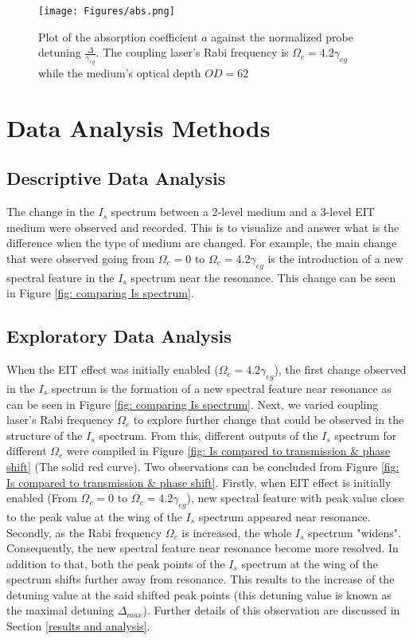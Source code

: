 \begin{figure}
    \centering
    \texttt{[image: Figures/abs.png]}
    \caption[Plot of Absorption Coefficient As A Function of Incident Probe Laser Detuning]{Plot of the absorption coefficient $a$ against the normalized probe detuning $\frac{\Delta}{\gamma_{eg}}$. The coupling laser's Rabi frequency is $\Omega_{c} = 4.2\gamma_{eg}$ while the medium's optical depth $OD = 62$}
    \label{fig: abs}
\end{figure}


\section{Data Analysis Methods}
\subsection{Descriptive Data Analysis}
The change in the $I_{s}$ spectrum between a 2-level medium and a 3-level EIT medium were observed and recorded. This is to visualize and answer what is the difference when the type of medium are changed. For example, the main change that were observed going from $\Omega_{c} = 0$ to $\Omega_{c} = 4.2\gamma_{eg}$ is the introduction of a new spectral feature in the $I_{s}$ spectrum near the resonance. This change can be seen in Figure \ref{fig: comparing Is spectrum}. 

\subsection{Exploratory Data Analysis}
When the EIT effect was initially enabled ($\Omega_{c} = 4.2\gamma_{eg}$), the first change observed in the $I_{s}$ spectrum is the formation of a new spectral feature near resonance as can be seen in Figure \ref{fig: comparing Is spectrum}. Next, we varied coupling laser's Rabi frequency $\Omega_{c}$ to explore further change that could be observed in the structure of the $I_{s}$ spectrum. From this, different outputs of the $I_{s}$ spectrum for different $\Omega_{c}$ were compiled in Figure \ref{fig: Is compared to transmission & phase shift} (The solid red curve). Two observations can be concluded from Figure \ref{fig: Is compared to transmission & phase shift}. Firstly, when EIT effect is initially enabled (From $\Omega_{c} = 0$ to $\Omega_{c} = 4.2\gamma_{eg}$), new spectral feature with peak value close to the peak value at the wing of the $I_{s}$ spectrum appeared near resonance. Secondly, as the Rabi frequency $\Omega_{c}$ is increased, the whole $I_{s}$ spectrum "widens". Consequently, the new spectral feature near resonance become more resolved. In addition to that, both the peak points of the $I_{s}$ spectrum at the wing of the spectrum shifts further away from resonance. This results to the increase of the detuning value at the said shifted peak points (this detuning value is known as the maximal detuning $\Delta_{max}$). Further details of this observation are discussed in Section \ref{results and analysis}.


